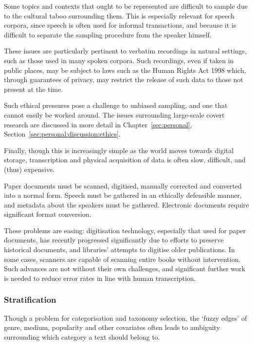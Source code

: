 Some topics and contexts that ought to be represented are difficult to sample due to the cultural taboo surrounding them. This is especially relevant for speech corpora, since speech is often used for informal transactions, and because it is difficult to separate the sampling procedure from the speaker himself.

These issues are particularly pertinent to verbatim recordings in natural settings, such as those used in many spoken corpora.  Such recordings, even if taken in public places, may be subject to laws such as the Human Rights Act 1998 which, through guarantees of privacy, may restrict the release of such data to those not present at the time.

Such ethical pressures pose a challenge to unbiased sampling, and one that cannot easily be worked around.  The issues surrounding large-scale covert research are discussed in more detail in Chapter~\ref{sec:personal}, Section~\ref{sec:personal:discussion:ethics}.

Finally, though this is increasingly simple as the world moves towards digital storage, transcription and physical acquisition of data is often slow, difficult, and (thus) expensive.

Paper documents must be scanned, digitised, manually corrected and converted into a normal form. Speech must be gathered in an ethically defensible manner, and metadata about the speakers must be gathered.  Electronic documents require significant format conversion.

These problems are easing: digitisation technology, especially that used for paper documents, has recently progressed significantly due to efforts to preserve historical documents, and libraries' attempts to digitise older publications. In some cases, scanners are capable of scanning entire books without intervention.  Such advances are not without their own challenges, and significant further work is needed to reduce error rates in line with human transcription\cite{ameliajoulainjay2015,alex2012digitised,6065393}.%








\subsubsection{Stratification}
Though a problem for categorisation and taxonomy selection, the `fuzzy edges' of genre, medium, popularity and other covariates often leads to ambiguity surrounding which category a text should belong to.

